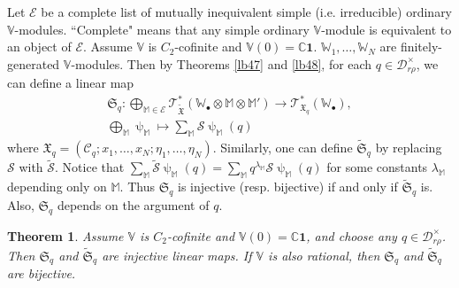 \documentclass[12pt,a4paper,notitlepage]{article}
\theoremstyle{definition}
\theoremstyle{plain}
\newtheorem{thm}[df]{Theorem}
\newcommand{\fk}{\mathfrak}
\newcommand{\mc}{\mathcal}
\newcommand{\wtd}{\widetilde}
\newcommand{\id}{\mathbf{1}}
\newcommand{\scr}{\mathscr}
\newcommand{\blt}{\bullet}
\newcommand{\Vbb}{\mathbb V}
\newcommand{\Wbb}{\mathbb W}
\newcommand{\Mbb}{\mathbb M}
\newcommand{\Cbb}{\mathbb C}
\numberwithin{equation}{section}
\begin{document}
Let $\mc E$ be a complete list of mutually inequivalent simple (i.e. irreducible) ordinary $\Vbb$-modules. ``Complete" means that any simple ordinary $\Vbb$-module is equivalent to an object of $\mc E$. Assume $\Vbb$ is $C_2$-cofinite and $\Vbb(0)=\Cbb\id$. $\Wbb_1,\dots,\Wbb_N$ are finitely-generated $\Vbb$-modules. Then by Theorems \ref{lb47} and \ref{lb48}, for each $q\in\mc D_{r\rho}^\times$, we can define a \index{Sq@$\fk S_q,\wtd{\fk S}_q$} linear map
\begin{gather}
\fk S_q:\bigoplus_{\Mbb\in\mc E}\scr T_{\wtd{\fk X}}^*(\Wbb_\blt\otimes\Mbb\otimes\Mbb')\rightarrow\scr T_{\fk X_q}^*(\Wbb_\blt),\label{eq92}\\
\bigoplus_\Mbb\uppsi_\Mbb\mapsto \sum_\Mbb\mc S\uppsi_\Mbb(q)\nonumber
\end{gather}
where $\fk X_q=(\mc C_q;x_1,\dots,x_N;\eta_1,\dots,\eta_N)$. Similarly, one can define $\wtd{\fk S}_q$ by replacing $\mc S$ with $\wtd{\mc S}$. Notice that $\sum_\Mbb\wtd{\mc S}\uppsi_\Mbb(q)=\sum_\Mbb q^{\lambda_\Mbb}\mc S\uppsi_\Mbb(q)$ for some constants $\lambda_\Mbb$ depending only on $\Mbb$. Thus $\fk S_q$ is injective (resp. bijective) if and only if $\wtd{\fk S}_q$ is. Also, $\fk S_q$ depends on the argument of $q$.


\begin{thm}\label{lb49}
Assume $\Vbb$ is $C_2$-cofinite and $\Vbb(0)=\Cbb\id$, and choose any $q\in\mc D_{r\rho}^\times$. Then $\fk S_q$ and $\wtd{\fk S}_q$ are injective linear maps. If $\Vbb$ is also rational, then $\fk S_q$ and $\wtd{\fk S}_q$ are bijective.
\end{thm}
\end{document}
